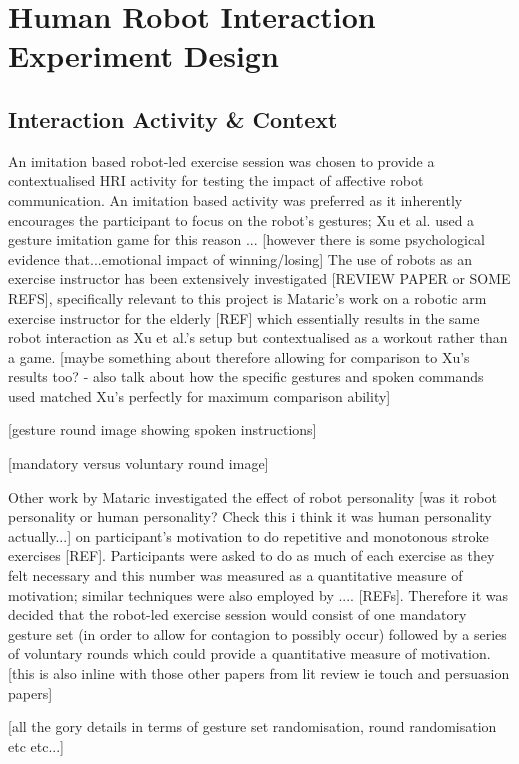 \documentclass[11pt,a4paper]{report}
\begin{document}
\section{Human Robot Interaction Experiment Design}
\subsection{Interaction Activity \& Context}

An imitation based robot-led exercise session was chosen to provide a contextualised HRI activity for testing the impact of affective robot communication. An imitation based activity was preferred as it inherently encourages the participant to focus on the robot's gestures; Xu et al. used a gesture imitation game for this reason \cite{xu2014robot} ... [however there is some psychological evidence that...emotional impact of winning/losing] The use of robots as an exercise instructor has been extensively investigated [REVIEW PAPER or SOME REFS], specifically relevant to this project is Mataric's work on a robotic arm exercise instructor for the elderly [REF] which essentially results in the same robot interaction as Xu et al.'s setup but contextualised as a workout rather than a game. [maybe something about therefore allowing for comparison to Xu's results too? - also talk about how the specific gestures and spoken commands used matched Xu's perfectly for maximum comparison ability]

[gesture round image showing spoken instructions]

[mandatory versus voluntary round image]

Other work by Mataric investigated the effect of robot personality [was it robot personality or human personality? Check this i think it was human personality actually...] on participant's motivation to do repetitive and monotonous stroke exercises [REF]. Participants were asked to do as much of each exercise as they felt necessary and this number was measured as a quantitative measure of motivation; similar techniques were also employed by .... [REFs]. Therefore it was decided that the robot-led exercise session would consist of one mandatory gesture set (in order to allow for contagion to possibly occur) followed by a series of voluntary rounds which could provide a quantitative measure of motivation. [this is also inline with those other papers from lit review ie touch and persuasion papers]

[all the gory details in terms of gesture set randomisation, round randomisation etc etc...]
\end{document}
